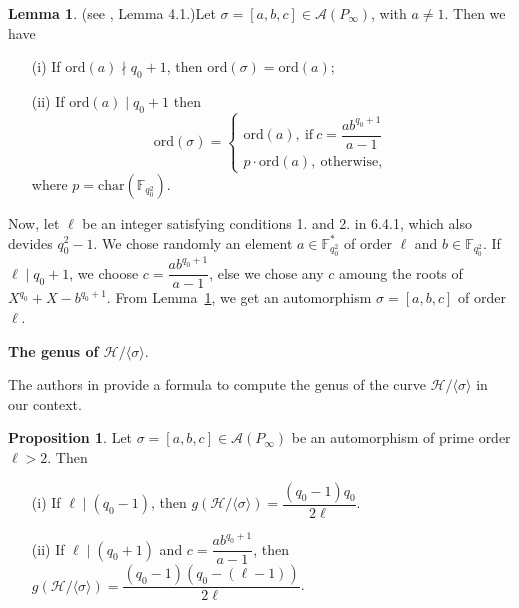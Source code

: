 \documentclass[10pt]{article}
\theoremstyle{definition}
\newtheorem{prop1}[thm]{Proposition}
\newtheorem{lem1}[thm]{Lemma}
\theoremstyle{definition}
\theoremstyle{definition}
\newcommand{\s}{\vspace{0.3cm}}
\newcommand{\cd}{\cdot}
\newcommand{\calA}{\mathcal{A}}
\newcommand{\calH}{\mathcal{H}}
\begin{document}
\s

\begin{lem1}(see \cite{Gar}, Lemma 4.1.)\label{ordsigma}
Let $\sigma = [a,b,c] \in \calA(P_{\infty})$, with $a \neq 1$. Then we have
\begin{itemize}
\item[(i)] If $\mathrm{ord}(a) \nmid q_0+1$, then $\mathrm{ord}(\sigma) = \mathrm{ord}(a)$;
\item[(ii)] If $\mathrm{ord}(a) \mid q_0+1$ then
\begin{equation*}
\mathrm{ord}(\sigma) = \left\{\begin{array}{ll}
\mathrm{ord}(a), \ \mathrm{if} \ c=\dfrac{ab^{q_0+1}}{a-1} \\
p \cd \mathrm{ord}(a), \  \mathrm{otherwise}, 
\end{array}
\right.
\end{equation*}
where $p=\mathrm{char}(\mathbb{F}_{q_0^2})$.
\end{itemize}
\end{lem1}

Now, let $\ell$ be an integer satisfying conditions 1. and 2. in 6.4.1, which also devides $q_0^2-1$. We chose randomly an element $a \in \mathbb{F}_{q_0^2}^*$ of order $\ell$ and $b \in \mathbb{F}_{q_0^2}$. If $\ell \mid q_0+1$, we choose $c=\dfrac{ab^{q_0+1}}{a-1}$, else we chose any $c$ amoung the roots of $X^{q_0}+X-b^{q_0+1}$. From Lemma~\ref{ordsigma}, we get an automorphism $\sigma = [a,b,c]$ of order $\ell$.

\s

\textbf{The genus of $\calH/\langle \sigma \rangle$}.

\s

The authors in \cite{Gar} provide a formula to compute the genus of the curve $\calH/\langle \sigma \rangle$ in our context.

\s

\begin{prop1} \label{genus}
Let $\sigma = [a,b,c] \in \calA(P_{\infty})$ be an automorphism of prime order $\ell > 2$. Then 
\begin{itemize}
\item[(i)] If $\ell \mid (q_0-1)$, then $g(\calH/\langle \sigma \rangle) = \dfrac{(q_0-1)q_0}{2\ell}$.
\item[(ii)] If $\ell \mid (q_0+1)$ and $c = \dfrac{ab^{q_0+1}}{a-1}$, then $g(\calH/\langle \sigma \rangle) = \dfrac{(q_0-1)(q_0-(\ell-1))}{2\ell}$.
\end{itemize}
\end{prop1}
\end{document}
